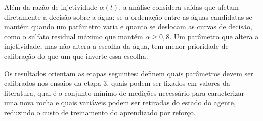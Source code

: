 \documentclass[10pt,a4paper]{article}
\begin{document}
Além da razão de injetividade $\alpha(t)$, a análise considera saídas que afetam
diretamente a decisão sobre a água: se a ordenação entre as águas candidatas se mantém
quando um parâmetro varia e quanto se deslocam as curvas de decisão, como o sulfato
residual máximo que mantém $\alpha \ge 0{,}8$. Um parâmetro que altera a injetividade, mas
não altera a escolha da água, tem menor prioridade de calibração do que um que inverte essa
escolha.

Os resultados orientam as etapas seguintes: definem quais parâmetros devem ser calibrados
nos ensaios da etapa 3, quais podem ser fixados em valores da literatura, qual é o conjunto
mínimo de medições necessário para caracterizar uma nova rocha e quais variáveis podem ser
retiradas do estado do agente, reduzindo o custo de treinamento do aprendizado por reforço.
\end{document}

